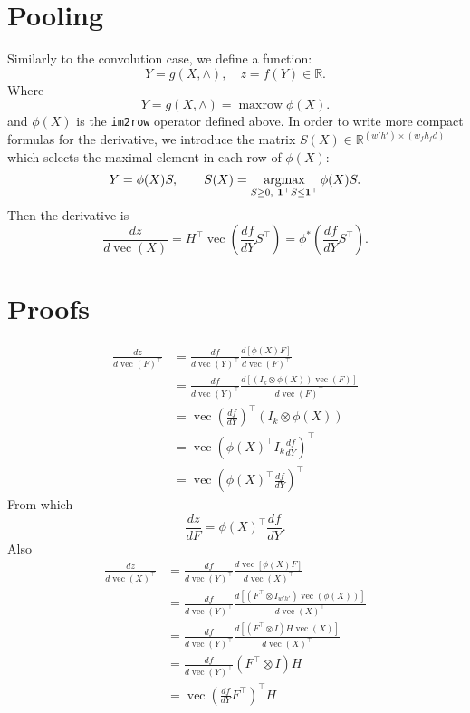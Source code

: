 \documentclass[12pt]{article}
\newcommand{\real}{\mathbb{R}}
\newcommand{\vv}{\operatorname{vec}}
\begin{document}
\section{Pooling}\label{s:pooling}

Similarly to the convolution case, we define a function:
\[
 Y = g(X,\wedge), \quad z = f(Y) \in \real.
\]
Where
\[
\boxed{Y = g(X,\wedge) = \operatorname{maxrow}\phi(X).}
\]
and $\phi(X)$ is the {\tt im2row} operator defined above. In order to write more compact formulas for the derivative, we introduce the matrix $S(X) \in \real^{(w'h')
\times(w_fh_fd)}$ which selects the maximal element in each row of $\phi(X)$:
\[
  Y = \phi(X)S,
  \qquad
   S(X) = \operatornamewithlimits{argmax}_{S \geq 0,\ \mathbf{1}^\top S \leq \mathbf{1}^\top} \phi(X) S.
\]
Then the derivative is
\[
\boxed{
\frac{d z}{d \vv(X)}
=
H^\top
\vv\left(
\frac{d f}{d Y}S^\top
\right)
=
\phi^*\left(
\frac{d f}{d Y}S^\top
\right).
}
\]


\appendix\section{Proofs}\label{s:proofs}

\begin{align*}
\frac{d z}{d \vv(F)^\top}
&=
\frac{d f}{d \vv(Y)^\top}
\frac{d [\phi(X) F]}{d\vv(F)^\top}
\\
&=
\frac{d f}{d \vv(Y)^\top}
\frac{d [\left(
I_k \otimes \phi(X)
\right)
\vv(F)]
}{d\vv(F)^\top}
\\
&=
\vv\left(\frac{d f}{d Y} \right)^\top
\left(
I_k \otimes \phi(X)
\right)
\\
&=
\vv\left(
\phi(X)^\top I_k \frac{d f}{d Y} 
\right)^\top
\\
&=
\vv\left(
\phi(X)^\top
\frac{d f}{d Y} 
\right)^\top
\end{align*}
From which
\[
\frac{dz}{dF}
=
\phi(X)^\top\frac{d f}{d Y}.
\]
Also
\begin{align*}
\frac{d z}{d \vv(X)^\top}
&=
\frac{d f}{d \vv(Y)^\top}
\frac{d \vv [\phi(X) F]}{d\vv(X)^\top}
\\
&=
\frac{d f}{d \vv(Y)^\top}
\frac{d [(F^\top \otimes I_{w'h'})\vv(\phi(X))]}{d\vv(X)^\top}
\\
&=
\frac{d f}{d \vv(Y)^\top}
\frac{d [(F^\top \otimes I)H \vv(X)]}{d\vv(X)^\top}
\\
&=
\frac{d f}{d \vv(Y)^\top} (F^\top\otimes I)H
\\
&=
\vv\left(
\frac{d f}{d Y}F^\top
\right)^\top H
\end{align*}
\end{document}
